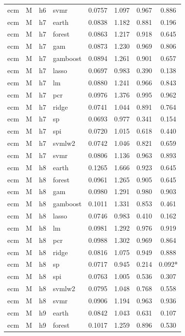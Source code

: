 \begin{ThreePartTable}
\begin{longtable}[t]{llclcccc}
ecm & M & h6 & svmr & 0.0757 & 1.097 & 0.967 & 0.886\\
\addlinespace
ecm & M & h7 & earth & 0.0838 & 1.182 & 0.881 & 0.196\\
ecm & M & h7 & forest & 0.0863 & 1.217 & 0.918 & 0.645\\
ecm & M & h7 & gam & 0.0873 & 1.230 & 0.969 & 0.806\\
ecm & M & h7 & gamboost & 0.0894 & 1.261 & 0.901 & 0.657\\
ecm & M & h7 & lasso & 0.0697 & 0.983 & 0.390 & 0.138\\
ecm & M & h7 & lm & 0.0880 & 1.241 & 0.966 & 0.843\\
ecm & M & h7 & pcr & 0.0976 & 1.376 & 0.995 & 0.962\\
ecm & M & h7 & ridge & 0.0741 & 1.044 & 0.891 & 0.764\\
ecm & M & h7 & sp & 0.0693 & 0.977 & 0.341 & 0.154\\
ecm & M & h7 & spi & 0.0720 & 1.015 & 0.618 & 0.440\\
ecm & M & h7 & svmlw2 & 0.0742 & 1.046 & 0.821 & 0.659\\
ecm & M & h7 & svmr & 0.0806 & 1.136 & 0.963 & 0.893\\
\addlinespace
ecm & M & h8 & earth & 0.1265 & 1.666 & 0.923 & 0.645\\
ecm & M & h8 & forest & 0.0961 & 1.265 & 0.905 & 0.645\\
ecm & M & h8 & gam & 0.0980 & 1.291 & 0.980 & 0.903\\
ecm & M & h8 & gamboost & 0.1011 & 1.331 & 0.853 & 0.461\\
ecm & M & h8 & lasso & 0.0746 & 0.983 & 0.410 & 0.162\\
ecm & M & h8 & lm & 0.0981 & 1.292 & 0.976 & 0.919\\
ecm & M & h8 & pcr & 0.0988 & 1.302 & 0.969 & 0.864\\
ecm & M & h8 & ridge & 0.0816 & 1.075 & 0.949 & 0.888\\
ecm & M & h8 & sp & 0.0717 & 0.945 & 0.214 & 0.092*\\
ecm & M & h8 & spi & 0.0763 & 1.005 & 0.536 & 0.307\\
ecm & M & h8 & svmlw2 & 0.0795 & 1.048 & 0.768 & 0.558\\
ecm & M & h8 & svmr & 0.0906 & 1.194 & 0.963 & 0.936\\
\addlinespace
ecm & M & h9 & earth & 0.0842 & 1.043 & 0.631 & 0.107\\
ecm & M & h9 & forest & 0.1017 & 1.259 & 0.896 & 0.530\\

\end{longtable}
\end{ThreePartTable}
